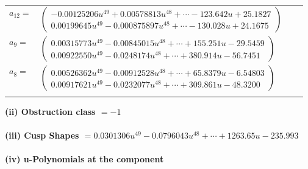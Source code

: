 \documentclass[1p]{elsarticle_modified}
\theoremstyle{definition}
\begin{document}
\begin{tabular}{m{7pt} m{180pt} m{7pt} m{180pt} }
\flushright $a_{12}=$&$\begin{pmatrix}-0.00125206 u^{49}+0.00578813 u^{48}+\cdots-123.642 u+25.1827\\0.00199645 u^{49}-0.000875897 u^{48}+\cdots-130.028 u+24.1675\end{pmatrix}$ \\
\flushright $a_{9}=$&$\begin{pmatrix}0.00315773 u^{49}-0.00845015 u^{48}+\cdots+155.251 u-29.5459\\0.00922550 u^{49}-0.0248174 u^{48}+\cdots+380.914 u-56.7451\end{pmatrix}$ \\
\flushright $a_{8}=$&$\begin{pmatrix}0.00526362 u^{49}-0.00912528 u^{48}+\cdots+65.8379 u-6.54803\\0.00917621 u^{49}-0.0232077 u^{48}+\cdots+309.861 u-48.3200\end{pmatrix}$\\&\end{tabular}
\flushleft \textbf{(ii) Obstruction class $= -1$}\\~\\
\flushleft \textbf{(iii) Cusp Shapes $= 0.0301306 u^{49}-0.0796043 u^{48}+\cdots+1263.65 u-235.993$}\\~\\
\newpage\renewcommand{\arraystretch}{1}
\flushleft \textbf{(iv) u-Polynomials at the component}\newline \\
\end{document}
